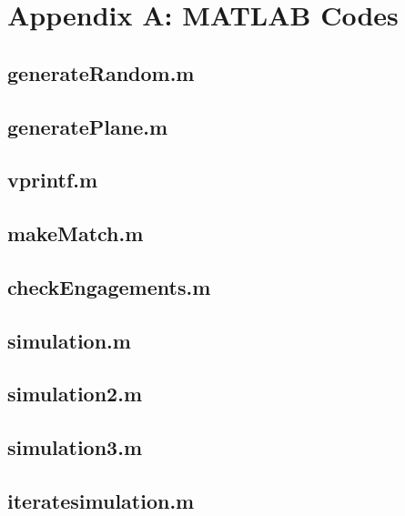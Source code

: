 \documentclass[11pt]{article}
\begin{document}
\renewcommand{\refname}{\section{References}}





\section{Appendix A: MATLAB Codes}

\subsection*{generateRandom.m}

\subsection*{generatePlane.m}

\subsection*{vprintf.m}

\subsection*{makeMatch.m}

\subsection*{checkEngagements.m}

\subsection*{simulation.m}

\subsection*{simulation2.m}

\subsection*{simulation3.m}

\subsection*{iteratesimulation.m}

\end{document}
